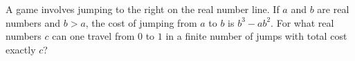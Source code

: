 A game involves jumping to the right on the real number line. If $a$ and $b$ are real numbers
and $b > a$, the cost of jumping from $a$ to $b$ is $b^3-ab^2$. For what real numbers
$c$ can one travel from $0$ to $1$ in a finite number of jumps with total cost exactly $c$?
